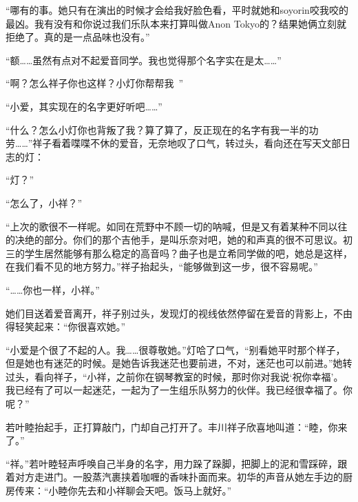 \documentclass{article}
\begin{document}
“哪有的事。她只有在演出的时候才会给我好脸色看，平时就她和soyorin咬我咬的最凶。我有没有和你说过我们乐队本来打算叫做Anon Tokyo的？结果她俩立刻就拒绝了。真的是一点品味也没有。”



“额……虽然有点对不起爱音同学。我也觉得那个名字实在是太……”



“啊？怎么祥子你也这样？小灯你帮帮我~”



“小爱，其实现在的名字更好听吧……”



“什么？怎么小灯你也背叛了我？算了算了，反正现在的名字有我一半的功劳……”祥子看着喋喋不休的爱音，无奈地叹了口气，转过头，看向还在写天文部日志的灯：



“灯？”



“怎么了，小祥？”



“上次的歌很不一样呢。如同在荒野中不顾一切的呐喊，但是又有着某种不同以往的决绝的部分。你们的那个吉他手，是叫乐奈对吧，她的和声真的很不可思议。初三的学生居然能够有那么稳定的高音吗？曲子也是立希同学做的吧，她总是这样，在我们看不见的地方努力。”祥子抬起头，“能够做到这一步，很不容易呢。”



“……你也一样，小祥。”



她们目送着爱音离开，祥子别过头，发现灯的视线依然停留在爱音的背影上，不由得轻笑起来：“你很喜欢她。”



“小爱是个很了不起的人。我……很尊敬她。”灯哈了口气，“别看她平时那个样子，但是她也有迷茫的时候。是她告诉我迷茫也要前进，不对，迷茫也可以前进。”她转过头，看向祥子，“小祥，之前你在钢琴教室的时候，那时你对我说‘祝你幸福’。我已经有了可以一起迷茫，一起为了一生组乐队努力的伙伴。我已经很幸福了。你呢？”



\newpage



若叶睦抬起手，正打算敲门，门却自己打开了。丰川祥子欣喜地叫道：“睦，你来了。”



“祥。”若叶睦轻声呼唤自己半身的名字，用力跺了跺脚，把脚上的泥和雪踩碎，跟着对方走进门。一股蒸汽裹挟着咖喱的香味扑面而来。初华的声音从她左手边的厨房传来：“小睦你先去和小祥聊会天吧。饭马上就好。”
\end{document}
